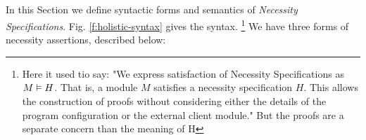 




\subsection{\Chainmail} %
\label{s:holistic-guarantees}

In this Section we define syntactic forms and semantics of
\emph{Necessity Specifications}. Fig. \ref{f:holistic-syntax} 
gives the syntax.
\footnote{
Here it used tio say: "We express satisfaction of Necessity Specifications as $M \vDash H$.
That is, a module $M$ satisfies a necessity specification $H$. This allows 
the construction of proofs without considering either the details 
of the program configuration or the external client module." But the proofs are
a separate concern than the meaning of H}
We have three forms of necessity assertions, described below:


